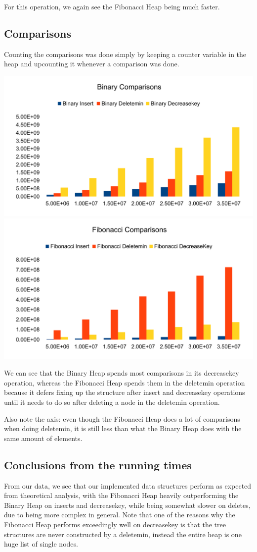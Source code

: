 For this operation, we again see the Fibonacci Heap being much faster.

\subsection{Comparisons}
Counting the comparisons was done simply by keeping a counter variable in the heap and upcounting it whenever a comparison was done.

\includegraphics[width=\textwidth]{graphs/bin_comp.pdf}
\includegraphics[width=\textwidth]{graphs/fib_comp.pdf}

We can see that the Binary Heap spends most comparisons in its decreasekey operation, whereas the Fibonacci Heap spends them in the deletemin operation because it defers fixing up the structure after insert and decreasekey operations until it needs to do so after deleting a node in the deletemin operation.

Also note the axis: even though the Fibonacci Heap does a lot of comparisons when doing deletemin, it is still less than what the Binary Heap does with the same amount of elements.

\subsection{Conclusions from the running times}
From our data, we see that our implemented data structures perform as expected from theoretical analysis, with the Fibonacci Heap heavily outperforming the  Binary Heap on inserts and decreasekey, while being somewhat slower on deletes, due to being more complex in  general.
Note that one of the reasons why the Fibonacci Heap performs exceedingly well on decreasekey is that the tree structures are never constructed by a deletemin, instead the entire heap is one huge list of single nodes. 


